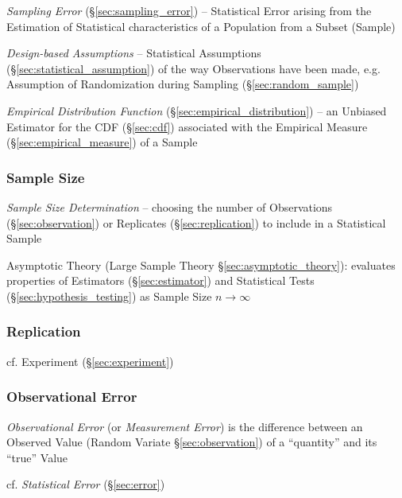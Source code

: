 \fist \emph{Sampling Error} (\S\ref{sec:sampling_error}) -- Statistical Error
arising from the Estimation of Statistical characteristics of a Population from
a Subset (Sample)

\fist \emph{Design-based Assumptions} -- Statistical Assumptions
(\S\ref{sec:statistical_assumption}) of the way Observations have been made,
e.g. Assumption of Randomization during Sampling (\S\ref{sec:random_sample})

\emph{Empirical Distribution Function} (\S\ref{sec:empirical_distribution}) --
an Unbiased Estimator for the CDF (\S\ref{sec:cdf}) associated with the
Empirical Measure (\S\ref{sec:empirical_measure}) of a Sample



\subsubsection{Sample Size}\label{sec:sample_size}

\emph{Sample Size Determination} -- choosing the number of Observations
(\S\ref{sec:observation}) or Replicates (\S\ref{sec:replication}) to include in
a Statistical Sample

\fist Asymptotic Theory (Large Sample Theory \S\ref{sec:asymptotic_theory}):
evaluates properties of Estimators (\S\ref{sec:estimator}) and Statistical Tests
(\S\ref{sec:hypothesis_testing}) as Sample Size $n \to \infty$



\subsubsection{Replication}\label{sec:sampling_replication}


cf. Experiment (\S\ref{sec:experiment})



\subsubsection{Observational Error}\label{sec:observational_error}

\emph{Observational Error} (or \emph{Measurement Error}) is the difference
between an Observed Value (Random Variate \S\ref{sec:observation}) of a
``quantity'' and its ``true'' Value

cf. \emph{Statistical Error} (\S\ref{sec:error})



